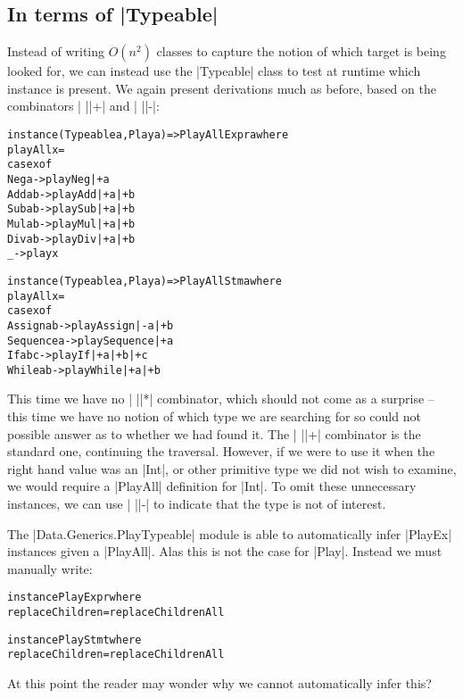 \documentclass[preprint]{sigplanconf}
\newenvironment{code}{\begin{alltt}\small}{\end{alltt}}
\begin{document}
\subsection{In terms of |Typeable|}

Instead of writing $O(n^2)$ classes to capture the notion of which target is being looked for, we can instead use the |Typeable| class to test at runtime which instance is present. We again present derivations much as before, based on the combinators | ||+| and | ||-|:

\begin{code}
instance (Typeable a, Play a) => PlayAll Expr a where
    playAll x =
        case x of
            Neg a    ->  play Neg  |+ a
            Add a b  ->  play Add  |+ a |+ b
            Sub a b  ->  play Sub  |+ a |+ b
            Mul a b  ->  play Mul  |+ a |+ b
            Div a b  ->  play Div  |+ a |+ b
            _        ->  play x

instance (Typeable a, Play a) => PlayAll Stm a where
    playAll x =
        case x of
            Assign    a b    -> play Assign    |-  a |+ b
            Sequence  a      -> play Sequence  |+  a
            If        a b c  -> play If        |+  a |+ b |+ c
            While     a b    -> play While     |+  a |+ b
\end{code}

This time we have no | ||*| combinator, which should not come as a surprise -- this time we have no notion of which type we are searching for so could not possible answer as to whether we had found it. The | ||+| combinator is the standard one, continuing the traversal. However, if we were to use it when the right hand value was an |Int|, or other primitive type we did not wish to examine, we would require a |PlayAll| definition for |Int|. To omit these unnecessary instances, we can use | ||-| to indicate that the type is not of interest.

The |Data.Generics.PlayTypeable| module is able to automatically infer |PlayEx| instances given a |PlayAll|. Alas this is not the case for |Play|. Instead we must manually write:

\begin{code}
instance Play Expr where
    replaceChildren = replaceChildrenAll

instance Play Stmt where
    replaceChildren = replaceChildrenAll
\end{code}

At this point the reader may wonder why we cannot automatically infer this?
\end{document}
